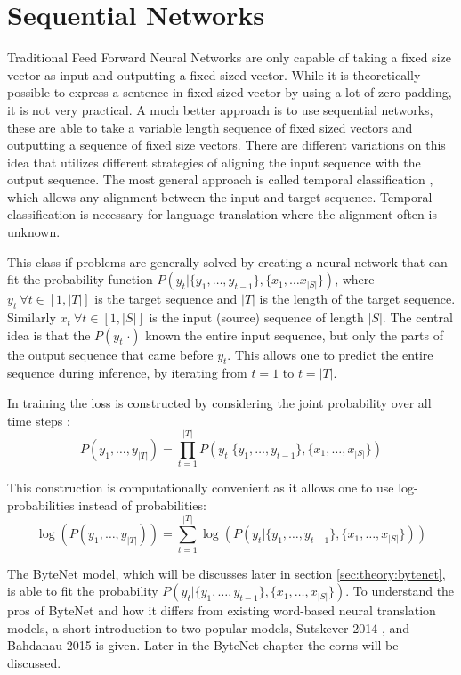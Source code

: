 \section{Sequential Networks}

Traditional Feed Forward Neural Networks are only capable of taking a fixed size vector as input and outputting a fixed sized vector. While it is theoretically possible to express a sentence in fixed sized vector by using a lot of zero padding, it is not very practical. A much better approach is to use sequential networks, these are able to take a variable length sequence of fixed sized vectors and outputting a sequence of fixed size vectors. There are different variations on this idea that utilizes different strategies of aligning the input sequence with the output sequence. The most general approach is called temporal classification \cite{alexgraves}, which allows any alignment between the input and target sequence. Temporal classification is necessary for language translation where the alignment often is unknown.

This class if problems are generally solved by creating a neural network that can fit the probability function $P(y_t | \{y_1, \dots, y_{t-1}\}, \{x_1, \dots x_{|S|}\})$, where $y_t\ \forall t \in [1, |T|]$ is the target sequence and $|T|$ is the length of the target sequence. Similarly $x_t\ \forall t \in [1, |S|]$ is the input (source) sequence of length $|S|$. The central idea is that the $P(y_t| \cdot)$ known the entire input sequence, but only the parts of the output sequence that came before $y_t$. This allows one to predict the entire sequence during inference, by iterating from $t = 1$ to $t = |T|$.

In training the loss is constructed by considering the joint probability over all time steps \cite{alexgraves}:
\begin{equation}
P(y_1, \dots, y_{|T|}) = \prod_{t=1}^{|T|} P(y_t | \{y_1, \dots, y_{t-1}\}, \{x_1, \dots, x_{|S|}\})
\end{equation}

This construction is computationally convenient as it allows one to use log-probabilities instead of probabilities:
\begin{equation}
\log(P(y_1, \dots, y_{|T|})) = \sum_{t=1}^{|T|} \log(P(y_t | \{y_1, \dots, y_{t-1}\}, \{x_1, \dots, x_{|S|}\}))
\end{equation}

The ByteNet model, which will be discusses later in section \ref{sec:theory:bytenet}, is able to fit the probability $P(y_t | \{y_1, \dots, y_{t-1}\}, \{x_1, \dots, x_{|S|}\})$. To understand the pros of ByteNet and how it differs from existing word-based neural translation models, a short introduction to two popular models, Sutskever 2014 \cite{sutskever-2014-nmt}, and Bahdanau 2015 \cite{bahdanau-2015-nmt} is given. Later in the ByteNet chapter the corns will be discussed.

